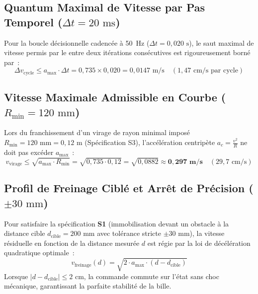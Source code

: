 \subsection{\texorpdfstring{Quantum Maximal de Vitesse par Pas Temporel ($\Delta t = 20\text{ ms}$)}{Quantum Maximal de Vitesse par Pas Temporel (Delta t = 20 ms)}}
Pour la boucle décisionnelle cadencée à 50~Hz ($\Delta t = 0{,}020\text{ s}$), le saut maximal de vitesse permis par le  entre deux itérations consécutives est rigoureusement borné par~:
\begin{equation}
    \Delta v_{\text{cycle}} \le a_{\max} \cdot \Delta t = 0{,}735 \times 0{,}020 = 0{,}0147\text{ m/s} \quad (1{,}47\text{ cm/s par cycle})
\end{equation}

\subsection{\texorpdfstring{Vitesse Maximale Admissible en Courbe ($R_{\min} = 120\text{ mm}$)}{Vitesse Maximale Admissible en Courbe (Rmin = 120 mm)}}
Lors du franchissement d'un virage de rayon minimal imposé $R_{\min} = 120\text{ mm} = 0{,}12\text{ m}$ (Spécification S3), l'accélération centripète $a_c = \frac{v^2}{R}$ ne doit pas excéder $a_{\max}$~:
\begin{equation}
    v_{\text{virage}} \le \sqrt{a_{\max} \cdot R_{\min}} = \sqrt{0{,}735 \cdot 0{,}12} = \sqrt{0{,}0882} \approx \mathbf{0{,}297\text{ m/s}} \quad (29{,}7\text{ cm/s})
\end{equation}

\subsection{\texorpdfstring{Profil de Freinage Ciblé et Arrêt de Précision ($\pm 30\text{ mm}$)}{Profil de Freinage Ciblé et Arrêt de Précision (+/- 30 mm)}}
Pour satisfaire la spécification \textbf{S1} (immobilisation devant un obstacle à la distance cible $d_{\text{cible}} = 200\text{ mm}$ avec tolérance stricte $\pm 30\text{ mm}$), la vitesse résiduelle en fonction de la distance mesurée $d$ est régie par la loi de décélération quadratique optimale~:
\begin{equation}
    v_{\text{freinage}}(d) = \sqrt{2 \cdot a_{\max} \cdot (d - d_{\text{cible}})}
\end{equation}
Lorsque $|d - d_{\text{cible}}| \le 2\text{ cm}$, la commande commute sur l'état  sans choc mécanique, garantissant la parfaite stabilité de la bille.
